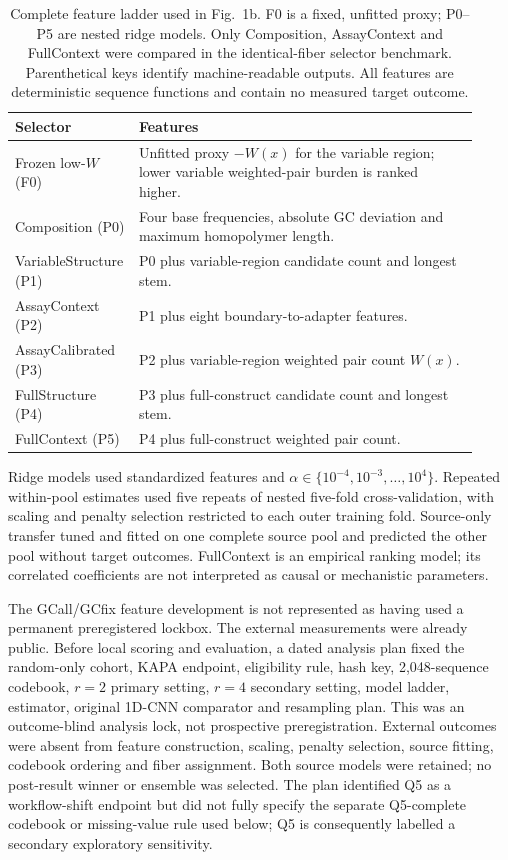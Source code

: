 \documentclass[10pt]{article}
\begin{document}
\begin{table}[H]
\centering
\small
\begin{tabular}{@{}p{0.20\linewidth}p{0.72\linewidth}@{}}
\toprule
Selector & Features \\
\midrule
Frozen low-$W$ (F0) & Unfitted proxy $-W(x)$ for the variable region; lower variable weighted-pair burden is ranked higher. \\
Composition (P0) & Four base frequencies, absolute GC deviation and maximum homopolymer length. \\
VariableStructure (P1) & P0 plus variable-region candidate count and longest stem. \\
AssayContext (P2) & P1 plus eight boundary-to-adapter features. \\
AssayCalibrated (P3) & P2 plus variable-region weighted pair count $W(x)$. \\
FullStructure (P4) & P3 plus full-construct candidate count and longest stem. \\
FullContext (P5) & P4 plus full-construct weighted pair count. \\
\bottomrule
\end{tabular}
\caption{Complete feature ladder used in Fig.~1b. F0 is a fixed, unfitted proxy; P0--P5 are nested ridge models. Only Composition, AssayContext and FullContext were compared in the identical-fiber selector benchmark. Parenthetical keys identify machine-readable outputs. All features are deterministic sequence functions and contain no measured target outcome.}
\label{tab:s-feature-ladder}
\end{table}

Ridge models used standardized features and $\alpha\in\{10^{-4},10^{-3},\ldots,10^4\}$. Repeated within-pool estimates used five repeats of nested five-fold cross-validation, with scaling and penalty selection restricted to each outer training fold. Source-only transfer tuned and fitted on one complete source pool and predicted the other pool without target outcomes. FullContext is an empirical ranking model; its correlated coefficients are not interpreted as causal or mechanistic parameters.

The GCall/GCfix feature development is not represented as having used a permanent preregistered lockbox. The external measurements were already public. Before local scoring and evaluation, a dated analysis plan fixed the random-only cohort, KAPA endpoint, eligibility rule, hash key, 2,048-sequence codebook, $r=2$ primary setting, $r=4$ secondary setting, model ladder, estimator, original 1D-CNN comparator and resampling plan. This was an outcome-blind analysis lock, not prospective preregistration. External outcomes were absent from feature construction, scaling, penalty selection, source fitting, codebook ordering and fiber assignment. Both source models were retained; no post-result winner or ensemble was selected. The plan identified Q5 as a workflow-shift endpoint but did not fully specify the separate Q5-complete codebook or missing-value rule used below; Q5 is consequently labelled a secondary exploratory sensitivity.
\end{document}
